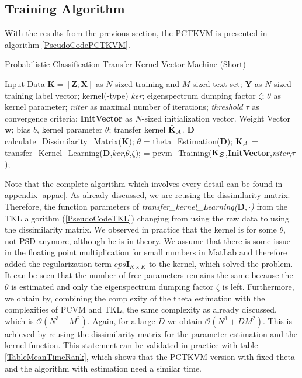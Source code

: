 \subsection{Training Algorithm}\label{InSubSecTraining}
With the results from the previous section, the \acs{PCTKVM} is presented in algorithm \ref{PseudoCodePCTKVM}.
\begin{algorithm}
	\caption{Probabilistic Classification Transfer Kernel Vector Machine (Short)}\label{PseudoCodePCTKVM}	
	\begin{algorithmic}[1]
		\Require Input Data $\mathbf{K} = [\mathbf{Z};\mathbf{X}]$ as $N$ sized training and $M$ sized text set; $\mathbf{Y}$ as $N$ sized training label vector; kernel(-type) \textit{ker}; eigenspectrum dumping factor $\zeta$; $\theta$ as kernel parameter; \textit{niter} as maximal number of iterations; \textit{threshold} $\tau$ as convergence criteria; \textbf{InitVector} as $N$-sized initialization vector.
		\Ensure Weight Vector $\mathbf{w}$; bias $b$, kernel parameter $\theta$; transfer kernel $\bar{\mathbf{K}}_\mathcal{A}$.
		\State $\mathbf{D}$ = calculate\_Dissimilarity\_Matrix($\mathbf{K}$);
		\State $\theta$ = theta\_Estimation($\mathbf{D}$);  
		\State $\bar{\mathbf{K}}_\mathcal{A}$ = transfer\_Kernel\_Learning($\mathbf{D}$,\textit{ker},$\theta$,$\zeta$); 
		\State [$\mathbf{w}$,$b$] = pcvm\_Training($\bar{\mathbf{K}}_\mathcal{Z}$,\textbf{InitVector},\textit{niter},$\tau$); 
	\end{algorithmic}
\end{algorithm}
Note that the complete algorithm which involves every detail can be found in appendix \ref{appac}. As already discussed, we are reusing the dissimilarity matrix. Therefore, the function parameters of \textit{transfer\_kernel\_Learning($\mathbf{D},\cdot$)} from the \acs{TKL} algorithm (\ref{PseudoCodeTKL}) changing from using the raw data to using the dissimilarity matrix.  
We observed in practice that the kernel is for some $\theta$, not \acs{PSD} anymore, although he is in theory.\cite{Long.2015}
We assume that there is some issue in the floating point multiplication for small numbers in MatLab and therefore added the regularization term $eps\mathbf{I}_{K\times K}$ to the kernel, which solved the problem.\\
It can be seen that the number of free parameters remains the same because the $\theta$ is estimated and only the eigenspectrum dumping factor $\zeta$ is left.
Furthermore, we obtain by, combining the complexity of the theta estimation with the complexities of \acs{PCVM} and \acs{TKL}, the same complexity as already discussed, which is $\mathcal{O}(N^3+M^2)$. Again, for a large $D$ we obtain $\mathcal{O}(N^3+DM^2)$.
This is achieved by reusing the dissimilarity matrix for the parameter estimation and the kernel function.
This statement can be validated in practice with table \ref{TableMeanTimeRank}, which shows that the \acs{PCTKVM} version with fixed theta and the algorithm with estimation need a similar time.
